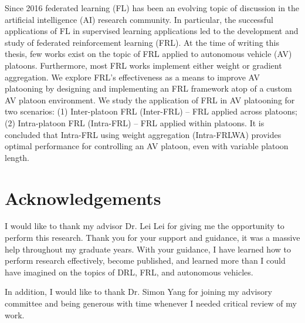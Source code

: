 \documentclass[oneside, 12pt]{book}
\begin{document}
Since 2016 federated learning (FL) has been an evolving topic of discussion in the artificial
intelligence (AI) research community.  In particular, the successful applications of FL
in supervised learning applications led to the development and study of
federated reinforcement learning (FRL).  At the time of writing this thesis,
few works exist on the topic of FRL applied to
autonomous vehicle (AV) platoons. Furthermore, most FRL works implement either weight or gradient aggregation.  We explore
FRL's effectiveness as a means to improve AV platooning by designing and implementing
an FRL framework atop of a custom AV platoon environment. We study the application of FRL in
AV platooning for two scenarios: (1) Inter-platoon FRL (Inter-FRL) -- FRL applied across platoons;
(2) Intra-platoon FRL (Intra-FRL) -- FRL applied within platoons. It is concluded that Intra-FRL using weight aggregation
(Intra-FRLWA) provides optimal performance for controlling an AV platoon, even with variable platoon length.

\chapter*{Acknowledgements}
\pagestyle{plain} %
I would like to thank my advisor Dr. Lei Lei for giving me the opportunity to perform this research.
Thank you for your support and guidance, it was a massive help throughout my graduate years.  With your guidance,
I have learned how to perform research effectively, become published, and learned more than I could have imagined on
the topics of DRL, FRL, and autonomous vehicles.

In addition, I would like to thank Dr. Simon Yang for joining my advisory committee and being
generous with time whenever I needed critical review of my work.
\newpage
{}
{}
\tableofcontents
\newpage
{}
{}
\listoftables
\newpage
{}
{}
\listoffigures
\newpage
\end{document}

